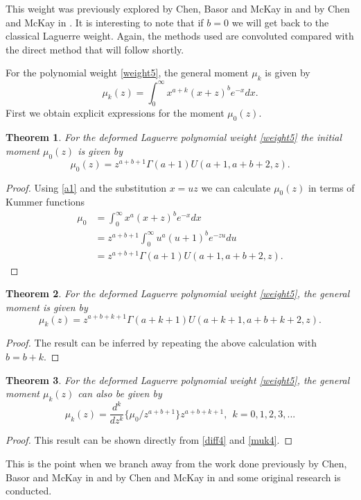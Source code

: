 \documentclass[12pt]{article}
\newtheorem{mydef}{Theorem}[section]
\numberwithin{figure}{section}
\numberwithin{equation}{section}
\numberwithin{table}{section}
\begin{document}
This weight was previously explored by Chen, Basor and McKay in \cite{P:1303.0773} and by Chen and McKay in \cite{P:58:4634}. It is interesting to note that if $b=0$ we will get back to the classical Laguerre weight.  Again, the methods used are convoluted compared with the direct method that will follow shortly.

For the  polynomial weight \eqref{weight5}, the  general moment $\mu_k$ is given by
\begin{equation}
\mu_k(z)=\int^{\infty}_{0} x^{ a+k}(x+z)^ b e^{-x}dx.
\end{equation}
First we obtain explicit expressions for the moment $\mu_0(z)$.
\begin{mydef}
For the deformed Laguerre  polynomial weight \eqref{weight5} the initial moment $\mu_0(z)$ is given by
\begin{equation}
\mu_0(z)=z^{ a+ b+1}\Gamma( a+1) U( a+1, a+ b+2,z).
\end{equation}
\end{mydef}
\begin{proof}
Using \eqref{a1} and the substitution $x=uz$ we can calculate $\mu_0(z)$ in terms of Kummer functions
\begin{align}\nonumber
\mu_{0}
&=\int^{\infty}_{0}x^ a(x+z)^ b e^{-x}dx\\\nonumber
&=z^{ a+ b+1}\int^{\infty}_{0}u^ a (u+1)^ b e^{-zu} du\\\nonumber
&=z^{ a+ b+1}\Gamma( a+1) U( a+1, a+ b+2,z).
\end{align}
\end{proof}
\begin{mydef}
For the deformed Laguerre polynomial weight \eqref{weight5}, the  general moment is given by
\begin{equation}\label{muk4}
\mu_k(z)=z^{ a+ b+k+1}\Gamma( a+k+1)U( a+k+1, a+ b+k+2,z).
\end{equation}
\end{mydef}
\begin{proof}
The result can be inferred by repeating the above calculation with $ b= b+k$.
\end{proof}
\begin{mydef}
For the deformed Laguerre polynomial weight \eqref{weight5}, the  general moment $\mu_k(z)$ can also be given by
\begin{equation}\nonumber
\mu_k(z)=\frac{d^{k}}{dz^{k}}\big\{\mu_{0}/z^{a+b+1}\big\}z^{a+b+k+1},~~k=0,1,2,3,...
\end{equation}
\end{mydef}
\begin{proof}
This result can be shown directly from \eqref{diff4} and \eqref{muk4}.
\end{proof}
This is the point when we branch away from the work done previously by Chen, Basor and McKay in \cite{P:1303.0773} and by Chen and McKay in \cite{P:58:4634} and some original research is conducted.
\end{document}
